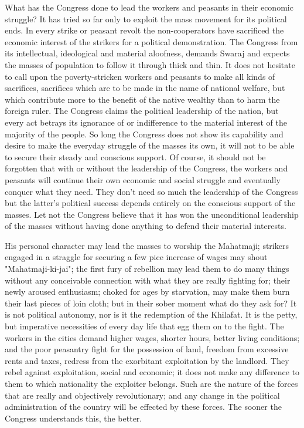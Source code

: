 What has the Congress done to lead the workers and peasants in their economic struggle? It has tried so far only to exploit the mass movement for its political ends. In every strike or peasant revolt the non-cooperators have sacrificed the economic interest of the strikers for a political demonstration. The Congress from its intellectual, ideological and material aloofness, demands Swaraj and expects the masses 
of population to follow it through thick and thin. It does not hesitate to call upon the poverty-stricken workers and peasants to make all kinds of sacrifices, sacrifices which are to be made in the name of national welfare, but which contribute more to the benefit of the native wealthy than to harm the foreign ruler. The Congress claims the political leadership of the nation, but every act betrays its ignorance of or 
indifference to the material interest of the majority of the people. So long the Congress does not show its capability and desire to make the everyday struggle of the masses its own, it will not to be able to secure their steady and conscious support. Of course, it should not be forgotten that with or without the leadership of the Congress, the workers and peasants will continue their own economic and social struggle and eventually conquer what they need. They don’t need so much the leadership of the Congress but the latter’s political success depends entirely on the conscious support of the masses. Let not the Congress believe that it has won the unconditional leadership of the masses without having done anything to defend their material interests. 

His personal character may lead the masses to worship the Mahatmaji; strikers engaged in a straggle for securing a few pice increase of wages may shout "Mahatmaji-ki-jai"; the first fury of rebellion may lead them to do many things without any conceivable connection with what they are really fighting for; their newly aroused enthusiasm; choked for ages by starvation, may make them burn their last pieces of loin cloth; but in their sober moment what do they ask for? It is not political autonomy, nor is it the redemption of the Khilafat. It is the petty, but imperative necessities of every day life that egg them on to the fight. The workers in the cities demand higher wages, shorter hours, better living conditions; and the poor peasantry fight for the possession of land, freedom from excessive rents and taxes, redress from the exorbitant exploitation by the landlord. They rebel against exploitation, social and economic; it does not make any difference to them to which nationality the exploiter belongs. Such are the nature of the forces that are really and objectively revolutionary; and any change in the political administration of the country will be effected by these forces. The sooner the Congress understands this, the better. 

